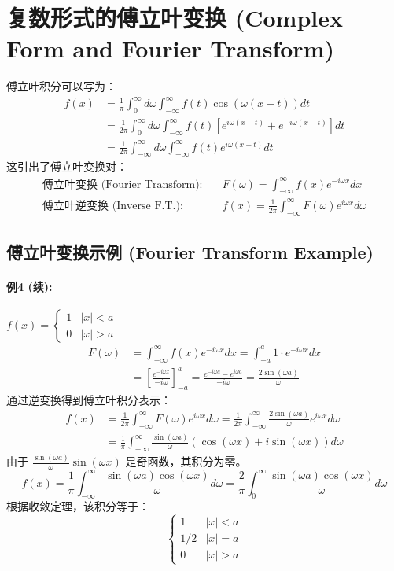 \documentclass{article}
\begin{document}
	\section{复数形式的傅立叶变换 (Complex Form and Fourier Transform)}
	傅立叶积分可以写为：
	\begin{align*}
		f(x) &= \frac{1}{\pi} \int_0^\infty d\omega \int_{-\infty}^\infty f(t) \cos(\omega(x-t)) dt \\
		&= \frac{1}{2\pi} \int_0^\infty d\omega \int_{-\infty}^\infty f(t) [e^{i\omega(x-t)} + e^{-i\omega(x-t)}] dt \\
		&= \frac{1}{2\pi} \int_{-\infty}^\infty d\omega \int_{-\infty}^\infty f(t) e^{i\omega(x-t)} dt
	\end{align*}
	这引出了傅立叶变换对：
	\begin{align*}
		\text{傅立叶变换 (Fourier Transform):} & \quad F(\omega) = \int_{-\infty}^\infty f(x) e^{-i\omega x} dx \\
		\text{傅立叶逆变换 (Inverse F.T.):} & \quad f(x) = \frac{1}{2\pi} \int_{-\infty}^\infty F(\omega) e^{i\omega x} d\omega
	\end{align*}
	
	\subsection{傅立叶变换示例 (Fourier Transform Example)}
	\paragraph{例4 (续):} $f(x) = \begin{cases} 1 & |x| < a \\ 0 & |x| > a \end{cases}$
	\begin{align*}
		F(\omega) &= \int_{-\infty}^\infty f(x) e^{-i\omega x} dx = \int_{-a}^a 1 \cdot e^{-i\omega x} dx \\
		&= \left[ \frac{e^{-i\omega x}}{-i\omega} \right]_{-a}^a = \frac{e^{-i\omega a} - e^{i\omega a}}{-i\omega} = \frac{2\sin(\omega a)}{\omega}
	\end{align*}
	通过逆变换得到傅立叶积分表示：
	\begin{align*}
		f(x) &= \frac{1}{2\pi} \int_{-\infty}^\infty F(\omega) e^{i\omega x} d\omega = \frac{1}{2\pi} \int_{-\infty}^\infty \frac{2\sin(\omega a)}{\omega} e^{i\omega x} d\omega \\
		&= \frac{1}{\pi} \int_{-\infty}^\infty \frac{\sin(\omega a)}{\omega} (\cos(\omega x) + i\sin(\omega x)) d\omega
	\end{align*}
	由于 $\frac{\sin(\omega a)}{\omega}\sin(\omega x)$ 是奇函数，其积分为零。
	$$ 
	f(x) = \frac{1}{\pi} \int_{-\infty}^\infty \frac{\sin(\omega a)\cos(\omega x)}{\omega} d\omega = \frac{2}{\pi} \int_0^\infty \frac{\sin(\omega a)\cos(\omega x)}{\omega} d\omega 
	$$
	根据收敛定理，该积分等于：
	$$ 
	\begin{cases} 1 & |x| < a \\ 1/2 & |x| = a \\ 0 & |x| > a \end{cases} 
	$$
	
\end{document}
